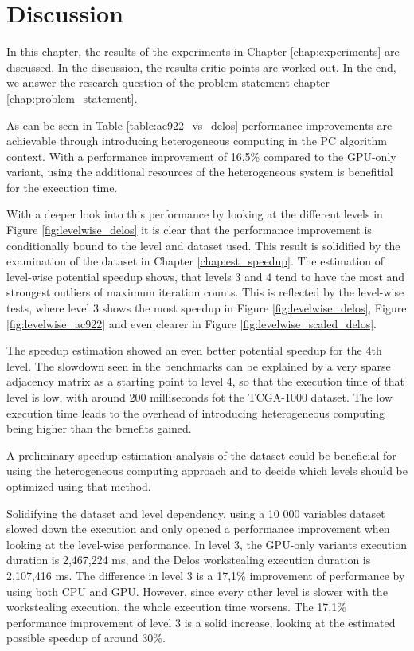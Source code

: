 \chapter{Discussion}
\label{chap:discussion}
In this chapter, the results of the experiments in Chapter \ref{chap:experiments} are discussed. In the discussion, the results critic points are worked out. In the end, we answer the research question of the problem statement chapter \ref{chap:problem_statement}.

% 
As can be seen in Table \ref{table:ac922_vs_delos} performance improvements are achievable through introducing heterogeneous computing in the PC algorithm context. With a performance improvement of 16,5\% compared to the GPU-only variant, using the additional resources of the heterogeneous system is benefitial for the execution time.

With a deeper look into this performance by looking at the different levels in Figure \ref{fig:levelwise_delos} it is clear that the performance improvement is conditionally bound to the level and dataset used. This result is solidified by the examination of the dataset in Chapter \ref{chap:est_speedup}. The estimation of level-wise potential speedup shows, that levels 3 and 4 tend to have the most and strongest outliers of maximum iteration counts. This is reflected by the level-wise tests, where level 3 shows the most speedup in Figure \ref{fig:levelwise_delos}, Figure \ref{fig:levelwise_ac922} and even clearer in Figure \ref{fig:levelwise_scaled_delos}.

The speedup estimation showed an even better potential speedup for the 4th level. The slowdown seen in the benchmarks can be explained by a very sparse adjacency matrix as a starting point to level 4, so that the execution time of that level is low, with around 200 milliseconds fot the TCGA-1000 dataset. The low execution time leads to the overhead of introducing heterogeneous computing being higher than the benefits gained.

A preliminary speedup estimation analysis of the dataset could be beneficial for using the heterogeneous computing approach and to decide which levels should be optimized using that method.

Solidifying the dataset and level dependency, using a 10 000 variables dataset slowed down the execution and only opened a performance improvement when looking at the level-wise performance. In level 3, the GPU-only variants execution duration is 2,467,224 ms, and the Delos workstealing execution duration is 2,107,416 ms.
The difference in level 3 is a 17,1\% improvement of performance by using both CPU and GPU. However, since every other level is slower with the workstealing execution, the whole execution time worsens. The 17,1\% performance improvement of level 3 is a solid increase, looking at the estimated possible speedup of around 30\%.

